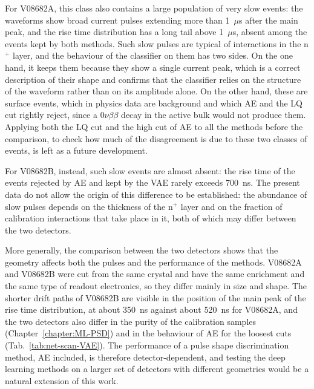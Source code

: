 For V08682A, this class also contains a large population of very slow events: the waveforms show broad current pulses extending more than 1~$\mu$s after the main peak, and the rise time distribution has a long tail above 1~$\mu$s, absent among the events kept by both methods. Such slow pulses are typical of interactions in the n$^+$ layer, and the behaviour of the classifier on them has two sides. On the one hand, it keeps them because they show a single current peak, which is a correct description of their shape and confirms that the classifier relies on the structure of the waveform rather than on its amplitude alone. On the other hand, these are surface events, which in physics data are background and which \ac{AE} and the \ac{LQ} cut rightly reject, since a $0\nu\beta\beta$ decay in the active bulk would not produce them. Applying both the \ac{LQ} cut and the high cut of \ac{AE} to all the methods before the comparison, to check how much of the disagreement is due to these two classes of events, is left as a future development.
 
For V08682B, instead, such slow events are almost absent: the rise time of the events rejected by \ac{AE} and kept by the \ac{VAE} rarely exceeds 700~ns. The present data do not allow the origin of this difference to be established: the abundance of slow pulses depends on the thickness of the n$^+$ layer and on the fraction of calibration interactions that take place in it, both of which may differ between the two detectors.

More generally, the comparison between the two detectors shows that the geometry affects both the pulses and the performance of the methods. V08682A and V08682B were cut from the same crystal and have the same enrichment and the same type of readout electronics, so they differ mainly in size and shape. The shorter drift paths of V08682B are visible in the position of the main peak of the rise time distribution, at about 350~ns against about 520~ns for V08682A, and the two detectors also differ in the purity of the calibration samples (Chapter~\ref{chapter:ML-PSD}) and in the behaviour of \ac{AE} for the loosest cuts (Tab.~\ref{tab:net-scan-VAE}). The performance of a pulse shape discrimination method, \ac{AE} included, is therefore detector-dependent, and testing the deep learning methods on a larger set of detectors with different geometries would be a natural extension of this work.

